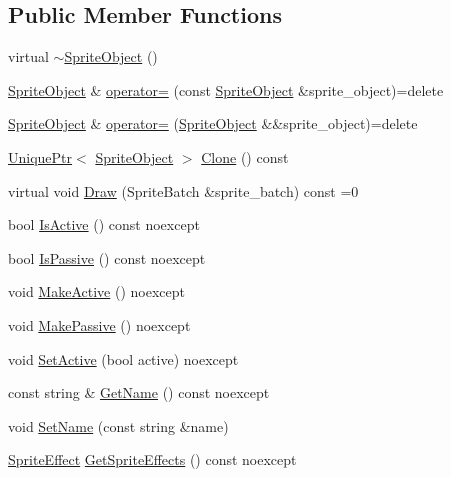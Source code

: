 \subsection*{Public Member Functions}
\begin{DoxyCompactItemize}
\item 
virtual \hyperlink{classmage_1_1_sprite_object_aad4d1472cb468d8c19b61ab030332ceb}{$\sim$\+Sprite\+Object} ()
\item 
\hyperlink{classmage_1_1_sprite_object}{Sprite\+Object} \& \hyperlink{classmage_1_1_sprite_object_ab24af642e7c49a13ca5526248f106b4e}{operator=} (const \hyperlink{classmage_1_1_sprite_object}{Sprite\+Object} \&sprite\+\_\+object)=delete
\item 
\hyperlink{classmage_1_1_sprite_object}{Sprite\+Object} \& \hyperlink{classmage_1_1_sprite_object_a0d098954e6ef5b331b2b7e6f6cb3c21e}{operator=} (\hyperlink{classmage_1_1_sprite_object}{Sprite\+Object} \&\&sprite\+\_\+object)=delete
\item 
\hyperlink{namespacemage_a8c307fbcc33bce9b7f2aa4c26c3b95cf}{Unique\+Ptr}$<$ \hyperlink{classmage_1_1_sprite_object}{Sprite\+Object} $>$ \hyperlink{classmage_1_1_sprite_object_a761528ee815cbac83f9a490e07752e5c}{Clone} () const
\item 
virtual void \hyperlink{classmage_1_1_sprite_object_a1c1c885fe7846f7ee1cc0b73571c2fa0}{Draw} (Sprite\+Batch \&sprite\+\_\+batch) const =0
\item 
bool \hyperlink{classmage_1_1_sprite_object_a4fbb934427eee923548dd027e19dc9ba}{Is\+Active} () const noexcept
\item 
bool \hyperlink{classmage_1_1_sprite_object_a194682f23dbdf7ce5a7345eaba4c2fa1}{Is\+Passive} () const noexcept
\item 
void \hyperlink{classmage_1_1_sprite_object_a145bdced3ec8ef41dfaf615f4ad7b1ef}{Make\+Active} () noexcept
\item 
void \hyperlink{classmage_1_1_sprite_object_a0d778b381ab405ae5fc6a858d6d465e0}{Make\+Passive} () noexcept
\item 
void \hyperlink{classmage_1_1_sprite_object_a8f27da427493db1567b842b83fa10f65}{Set\+Active} (bool active) noexcept
\item 
const string \& \hyperlink{classmage_1_1_sprite_object_a1bfe66d73a37eac4c8e8a7b0e17112aa}{Get\+Name} () const noexcept
\item 
void \hyperlink{classmage_1_1_sprite_object_a784cd7d61f3a9f71a521656ae3199366}{Set\+Name} (const string \&name)
\item 
\hyperlink{namespacemage_a9cfe18123066ba4236f548f9de75d881}{Sprite\+Effect} \hyperlink{classmage_1_1_sprite_object_a05f4124356abc1eec2158017ef3d947e}{Get\+Sprite\+Effects} () const noexcept

\end{DoxyCompactItemize}
